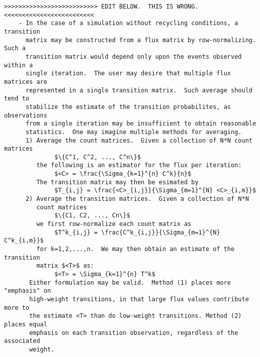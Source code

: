 \documentclass[10pt]{article}
\begin{document}
\begin{Verbatim}[commandchars=\\\{\},codes={\catcode`$=3\catcode`^=7\catcode`_=8}]
>>>>>>>>>>>>>>>>>>>>>>>>>> EDIT BELOW.  THIS IS WRONG. <<<<<<<<<<<<<<<<<<<<<<<<<
    - In the case of a simulation without recycling conditions, a transition
      matrix may be constructed from a flux matrix by row-normalizing. Such a
      transition matrix would depend only upon the events observed within a 
      single iteration.  The user may desire that multiple flux matrices are 
      represented in a single transition matrix.  Such average should tend to
      stabilize the estimate of the transition probabilites, as observations 
      from a single iteration may be insufficient to obtain reasonable
      statistics.  One may imagine multiple methods for averaging.
      1) Average the count matrices.  Given a collection of N*N count matrices
              $\{C^1, C^2, ..., C^n\}$
         the following is an estimator for the flux per iteration:
              $<C> = \frac{\Sigma_{k=1}^{n} C^k}{n}$
         The transition matrix may then be esimated by 
              $T_{i,j} = \frac{<C>_{i,j}}{\Sigma_{m=1}^{N} <C>_{i,m}}$
      2) Average the transition matrices.  Given a collection of N*N 
         count matrices 
              $\{C1, C2, ..., Cn\}$
         we first row-normalize each count matrix as 
              $T^k_{i,j} = \frac{C^k_{i,j}}{\Sigma_{m=1}^{N} C^k_{i,m}}$
         for k=1,2,...,n.  We may then obtain an estimate of the transition
         matrix $<T>$ as:
              $<T> = \Sigma_{k=1}^{n} T^k$
       Either formulation may be valid.  Method (1) places more "emphasis" on 
       high-weight transitions, in that large flux values contribute more to 
       the estimate <T> than do low-weight transitions. Method (2) places equal
       emphasis on each transition observation, regardless of the associated
       weight.

\end{Verbatim}
\end{document}
